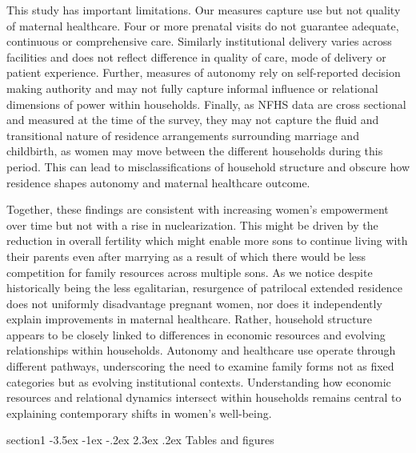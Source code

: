\documentclass[12pt]{article}
\makeatletter
\renewcommand\section{\@startsection
{section}{1}{\z@}
{-3.5ex \@plus -1ex \@minus -.2ex}
{2.3ex \@plus.2ex}
{\centering\normalfont\Large\bfseries}}
\makeatother
\begin{document}
This study has important limitations. Our measures capture use but not quality of maternal healthcare. Four or more prenatal visits do not guarantee adequate, continuous or comprehensive care. Similarly institutional delivery varies across facilities and does not reflect difference in quality of care, mode of delivery or patient experience. Further, measures of autonomy rely on self-reported decision making authority and may not fully capture informal influence or relational dimensions of power within households.  Finally, as NFHS data are cross sectional and measured at the time of the survey, they may not capture the fluid and transitional nature of residence arrangements surrounding marriage and childbirth, as women may move between the different households during this period. This can lead to misclassifications of household structure and obscure how residence shapes autonomy and maternal healthcare outcome.

Together, these findings are consistent with increasing women's empowerment over time but not with a rise in nuclearization. This might be driven by the reduction in overall fertility which might enable more sons to continue living with their parents even after marrying as a result of which there would be less competition for family resources across multiple sons. As we notice despite historically being the less egalitarian, resurgence of patrilocal extended residence does not uniformly disadvantage pregnant women, nor does it independently explain improvements in maternal healthcare. Rather, household structure appears to be closely linked to differences in economic resources and evolving relationships within households. Autonomy and healthcare use operate through different pathways, underscoring the need to examine family forms not as fixed categories but as evolving institutional contexts. Understanding how economic resources and relational dynamics intersect within households remains central to explaining contemporary shifts in women’s well-being.






\newpage
\section{Tables and figures}
\end{document}
